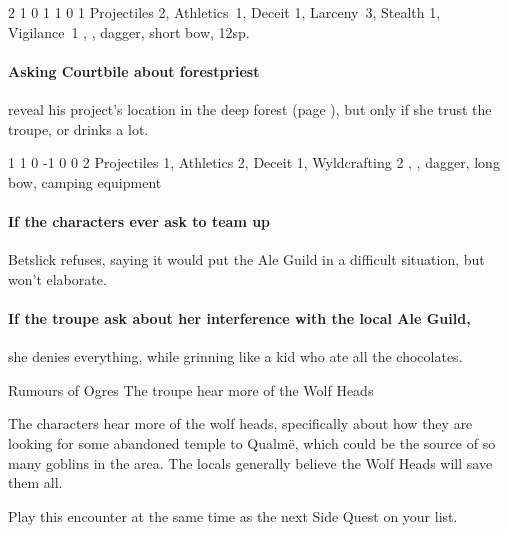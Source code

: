 {2}%
{1}%
{{0}%
{1}%
{1}}%
{0}%
{1}%
{Projectiles 2, Athletics~1, Deceit 1, Larceny~3, Stealth 1, Vigilance~1\knacks{\snapshot, \laststand}}%
{\shortsword, \partialleather, dagger, short bow, 12sp.}%
{\addtocounter{fp}{5}}
\label{courtbile}

\paragraph{Asking Courtbile about \gls{forestpriest}}
reveal his project's location in the deep forest (page \pageref{lostcity}), but only if she trust the troupe, or drinks a lot.

{1}%
{1}%
{{0}%
{-1}%
{0}}%
{0}%
{2}%
{Projectiles 1, Athletics 2, Deceit 1, Wyldcrafting 2\knacks{\adrenalinesurge, \unstoppable, \charge}}%
{\greatsword, \partialchain, dagger, long bow, camping equipment}%
{}

\paragraph{If the characters ever ask to team up}
Betslick refuses, saying it would put the Ale Guild in a difficult situation, but won't elaborate.

\southSeeker

\beardedalemaster
\label{beardedalemaster}

\paragraph{If the troupe ask about her interference with the local Ale Guild,}
she denies everything, while grinning like a kid who ate all the chocolates.

{\N \squash Rumours of Ogres}%
{The troupe hear more of the Wolf Heads}%

The characters hear more of the wolf heads, specifically about how they are looking for some abandoned temple to Qualm\"e, which could be the source of so many goblins in the area.
The locals generally believe the Wolf Heads will save them all.

Play this encounter at the same time as the next Side Quest on your list.

